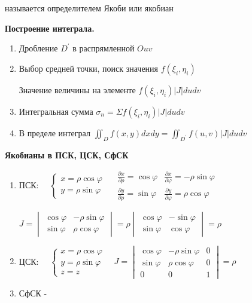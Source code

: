\documentclass[12pt]{article}
\begin{document}
    называется определителем Якоби или якобиан

    \vspace{5mm}

    \textbf{Построение интеграла.}
    \begin{enumerate}
        \item Дробление $D^\prime$ в распрямленной $Ouv$
        \item Выбор средней точки, поиск значения $f(\xi_i, \eta_i)$

        Значение величины на элементе $f(\xi_i, \eta_i) |J| du dv$
        \item Интегральная сумма $\sigma_n = \Sigma f(\xi_i, \eta_i) |J| du dv$
        \item В пределе интеграл $\iint_D f(x, y) dx dy = \iint_{D^\prime} f(u, v) |J| du dv$
    \end{enumerate}

    \vspace{5mm}

    \textbf{Якобианы в ПСК, ЦСК, СфСК}

    \begin{enumerate}
        \item ПСК: $\quad \begin{cases}
                              x = \rho\cos\varphi \\ y = \rho\sin\varphi
        \end{cases} \quad
        \begin{matrix}
            \frac{\partial x}{\partial \rho} = \cos\varphi & \frac{\partial x}{\partial \varphi} = -\rho\sin\varphi \\
            \frac{\partial y}{\partial \rho} = \sin\varphi & \frac{\partial y}{\partial \varphi} = \rho\cos\varphi
        \end{matrix}$

        $J = \begin{vmatrix}\cos\varphi & -\rho\sin\varphi \\ \sin\varphi & \rho\cos\varphi\end{vmatrix} =
        \rho \begin{vmatrix}\cos\varphi & -\sin\varphi \\ \sin\varphi & \cos\varphi\end{vmatrix} = \rho$

        \item ЦСК: $\quad \begin{cases}
                              x = \rho\cos\varphi \\ y = \rho\sin\varphi \\ z = z
        \end{cases} \quad J = \begin{vmatrix}\cos\varphi & -\rho\sin\varphi & 0 \\ \sin\varphi & \rho\cos\varphi & 0 \\ 0 & 0 & 1\end{vmatrix} = \rho$

        \item СфСК - \Lab
    \end{enumerate}
\end{document}
